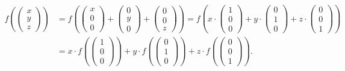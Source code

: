 \begin{equation}
 \label{eq:hom-dot-product}
 \begin{split}
  f \left( 
  \begin{pmatrix}
   x\\
   y\\
   z
  \end{pmatrix}
 \right) &= f \left( 
  \begin{pmatrix}
   x\\
   0\\
   0
  \end{pmatrix} + 
  \begin{pmatrix}
   0\\
   y\\
   0
  \end{pmatrix}
  +
  \begin{pmatrix}
   0\\
   0\\
   z
  \end{pmatrix}
  \right) = f \left( x \cdot 
  \begin{pmatrix}
   1\\
   0\\
   0
  \end{pmatrix} + y \cdot
  \begin{pmatrix}
   0\\
   1\\
   0
  \end{pmatrix} + z \cdot 
  \begin{pmatrix}
   0\\
   0\\
   1
  \end{pmatrix}
  \right)\\
  &= x \cdot f \left( 
  \begin{pmatrix}
   1\\
   0\\
   0
  \end{pmatrix}
  \right) + y \cdot f \left( 
  \begin{pmatrix}
   0\\
   1\\
   0
  \end{pmatrix}
  \right) + z \cdot f \left( 
  \begin{pmatrix}
   0\\
   0\\
   1
  \end{pmatrix}
  \right).
 \end{split}
\end{equation}
